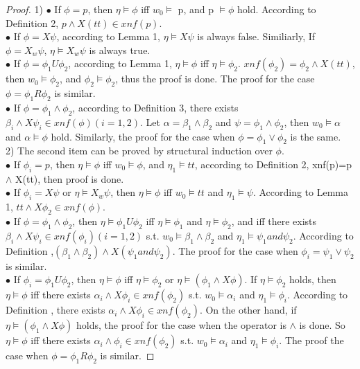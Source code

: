 \begin{proof}
1) $\bullet$ If $\phi = p$, then $\eta \models \phi$ iff $w_0 \models$ p, and p $\models \phi$ hold. According to Definition 2, $p \wedge X(tt) \in xnf(p)$.\\
$\bullet$ If $\phi=X \psi$, according to Lemma 1, $\eta \models X \psi$ is always false. Similiarly, If $\phi=X_{w} \psi$, $\eta \models X_{w} \psi$ is always true.\\
$\bullet$ If $\phi=\phi_{1} U \phi_{2}$, according to Lemma 1, $\eta \models \phi$ iff $\eta \models \phi_{2}$. $xnf(\phi_{2})=\phi_{2} \wedge X(tt)$, then  $w_0 \models \phi_{2}$, and $\phi_{2} \models \phi_{2}$, thus the proof is done. The proof for the case $\phi=\phi_{1} R \phi_{2}$ is similar. \\
$\bullet$ If $\phi=\phi_{1} \wedge \phi_{2}$, according to Definition 3, there exists $\beta_i \wedge X\psi_i \in xnf(\phi)(i = 1,2).$ Let $\alpha = \beta_1 \wedge \beta_2$ and $\psi = \phi_1 \wedge \phi_2$, then $w_0 \models \alpha$ and $\alpha \models \phi$ hold. Similarly, the proof for the case when $\phi = \phi_1 \vee \phi_2$ is the same. \\
2) The second item can be proved by structural induction over $\phi$.\\
 $\bullet$ If $\phi_i = p$, then $\eta \models \phi$ iff $w_0 \models \phi$, and $\eta_1 \models tt$, according to Definition 2, xnf(p)=p $\wedge$ X(tt), then proof is done.\\
 $\bullet$ If $\phi_i=X \psi$ or $\eta \models X_w \psi$, then $\eta \models \phi$ iff $w_0 \models tt$ and $\eta_1 \models \psi$. According to Lemma 1, $tt \wedge X\phi_2 \in xnf(\phi)$.\\
$\bullet$ If $\phi=\phi_1 \wedge \phi_2$, then $\eta \models \phi_1 U \phi_2$ iff $\eta \models \phi_1$ and $\eta \models \phi_2$, and iff there exists $\beta_i \wedge X\psi_i \in xnf(\phi_i)(i=1,2)$ s.t. $w_0 \models \beta_1 \wedge \beta_2$ and $\eta_1 \models \psi_1 and \psi_2$. According to Definition ,$(\beta_1 \wedge \beta_2)\wedge X(\psi_1 and \psi_2)$. The proof for the case when $\phi_i=\psi_{1} \vee \psi_{2}$ is similar. \\
 $\bullet$ If $\phi_i=\phi_{1} U \phi_{2}$, then $\eta \models \phi$ iff $\eta \models \phi_2$ or $\eta \models (\phi_1 \wedge X\phi)$. If $\eta \models \phi_2$ holds, then $\eta \models \phi$ iff there exists $\alpha_i \wedge X\phi_i \in xnf(\phi_2)$ s.t. $w_0 \models \alpha_i$ and $\eta_1 \models \phi_i$. According to Definition , there exists $\alpha_i \wedge X\phi_i \in xnf(\phi_2)$. On the other hand, if $\eta \models (\phi_1 \wedge X\phi)$ holds, the proof for the case when the operator is $\wedge$ is done. So $\eta \models \phi$ iff there exists $\alpha_i \wedge \phi_i \in xnf(\phi_2)$ s.t. $w_0 \models \alpha_i$ and $\eta_1 \models \phi_i$. The proof the case when $\phi=\phi_1 R \phi_2$ is similar.
\end{proof}
